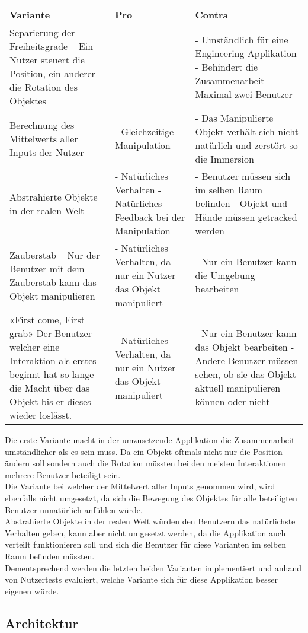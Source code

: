 \begin{center}
	\begin{tabularx} {\textwidth} { |X|X|X| }
		\hline
		\rowcolor{black}
		\color{white} \textbf{Variante} & \color{white} \textbf{Pro} & 
		\color{white} \textbf{Contra} \\
		\hline
		Separierung der Freiheitsgrade – Ein Nutzer steuert die Position, ein anderer die Rotation des Objektes &  & - Umständlich für eine Engineering Applikation - Behindert die Zusammenarbeit - Maximal zwei Benutzer\\
		\hline
		Berechnung des Mittelwerts aller Inputs der Nutzer & - Gleichzeitige Manipulation & - Das Manipulierte Objekt verhält sich nicht natürlich und zerstört so die Immersion \\
		\hline
		Abstrahierte Objekte in der realen Welt & - Natürliches Verhalten - Natürliches Feedback bei der Manipulation & - Benutzer müssen sich im selben Raum befinden - Objekt und Hände müssen getracked werden \\
		\hline
		Zauberstab – Nur der Benutzer mit dem Zauberstab kann das Objekt manipulieren & - Natürliches Verhalten, da nur ein Nutzer das Objekt manipuliert & - Nur ein Benutzer kann die Umgebung bearbeiten \\
		\hline	
		«First come, First grab» Der Benutzer welcher eine Interaktion als erstes beginnt hat so lange die Macht über das Objekt bis er dieses wieder loslässt. & - Natürliches Verhalten, da nur ein Nutzer das Objekt manipuliert & - Nur ein Benutzer kann das Objekt bearbeiten - Andere Benutzer müssen sehen, ob sie das Objekt aktuell manipulieren können oder nicht \\
		\hline	
	\end{tabularx}
\end{center}
\label{tbl:varianten_gleichzeitige_interaktion}

\bigskip
Die erste Variante macht in der umzusetzende Applikation die Zusammenarbeit umständlicher als es sein muss. Da ein Objekt oftmals nicht nur die Position ändern soll sondern auch die Rotation müssten bei den meisten Interaktionen mehrere Benutzer beteiligt sein. \\
Die Variante bei welcher der Mittelwert aller Inputs genommen wird, wird ebenfalls nicht umgesetzt, da sich die Bewegung des Objektes für alle beteiligten Benutzer unnatürlich anfühlen würde. \\
Abstrahierte Objekte in der realen Welt würden den Benutzern das natürlichste Verhalten geben, kann aber nicht umgesetzt werden, da die Applikation auch verteilt funktionieren soll und sich die Benutzer für diese Varianten im selben Raum befinden müssten. \\
Dementsprechend werden die letzten beiden Varianten implementiert und anhand von Nutzertests evaluiert, welche Variante sich für diese Applikation besser eigenen würde.

\subsection{Architektur}